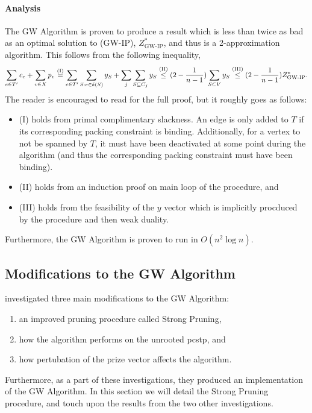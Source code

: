  \paragraph{Analysis}
 The GW Algorithm is proven to produce a result which is less than twice as bad as an optimal solution to (GW-IP), $Z^*_{\text{GW-IP}}$, and thus
 is a 2-approximation algorithm. This follows from the following inequality,
 $$\sum_{e \in T'}c_e + \sum_{v \in X} p_v \overset{\text{(I)}}{=}   \sum_{e \in T'} \sum_{S: e \in \delta(S)} y_S  + \sum_{j} \sum_{S \subseteq C_j} y_S
 \overset{\text{(II)}}{\leq} (2 - \frac{1}{n-1}) \sum_{S \subset V} y_S \overset{\text{(III)}}{\leq} (2 - \frac{1}{n-1}) Z^*_{\text{GW-IP}}\mathnormal{.}$$
 The reader is encouraged to read \citet{goemans1997primal} for the full proof, but it roughly goes as follows:
 \begin{itemize}
 \item (I) holds from primal complimentary slackness. An edge is only added to $T$ if its corresponding packing constraint is binding.
   Additionally, for a vertex to not be spanned by $T$, it must have been deactivated at some point during the
    algorithm (and thus the corresponding packing constraint must have
    been binding).
  \item (II) holds from an induction proof on main loop of the procedure, and
  \item (III) holds from the feasibility of the $y$ vector which is implicitly procduced by the procedure and then weak duality.
 \end{itemize}
 Furthermore, the GW Algorithm is proven to run in $O(n^2 \log n)$.
 \subsection{Modifications to the GW Algorithm}\label{sec:approx:strongpruning}
 \citet{Johnson:2000:PCS:338219.338637} investigated three main modifications to the GW Algorithm:
 \begin{enumerate}
 \item an improved pruning procedure called Strong Pruning,
 \item how the algorithm performs on the unrooted \gls{pcstp}, and
 \item how pertubation of the prize vector affects the algorithm.
 \end{enumerate}
 Furthermore, as a part of these investigations, they produced an implementation of the GW Algorithm.
 In this section we will detail the Strong Pruning procedure, and touch upon the results from the two other
  investigations.
